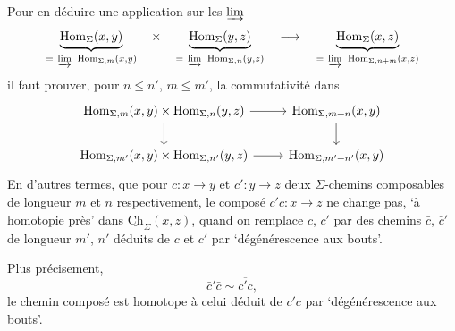 \documentclass[11pt]{article}
\newcommand{\msp}[1]{\marginpar{\footnotesize [#1]}}
\newcommand{\uCh}{\underline{\mathrm{Ch}}}
\newcommand{\Hom}{\mathrm{Hom}}
\begin{document}
\msp{page 10}
Pour en déduire une application sur les $\varinjlim$
\[
\underbrace{\Hom_\Sigma(x,y)}_{=\ \varinjlim\ \Hom_{\Sigma,m}(x,y)}\quad\times\quad\underbrace{\Hom_\Sigma(y,z)}_{=\ \varinjlim\ \Hom_{\Sigma,n}(y,z)}\quad\longrightarrow\quad\underbrace{\Hom_\Sigma(x,z)}_{=\ \varinjlim\ \Hom_{\Sigma,n+m}(x,z)}
\]
il faut prouver, pour $n\leq n'$, $m\leq m'$, la commutativité dans
\[
\begin{tikzcd}
\Hom_{\Sigma,m}(x,y)\times\Hom_{\Sigma,n}(y,z) \arrow[r] \arrow[d] & \Hom_{\Sigma,m+n}(x,y) \arrow[d] \\
\Hom_{\Sigma,m'}(x,y)\times\Hom_{\Sigma,n'}(y,z) \arrow[r] & \Hom_{\Sigma,m'+n'}(x,y)
\end{tikzcd}
\]
 En d'autres termes, que pour $c:x\longrightarrow y$ et $c':y\longrightarrow z$ deux $\Sigma$-chemins composables de longueur $m$ et $n$ respectivement, le composé $c'c:x\longrightarrow z$ ne change pas, `à homotopie près' dans $\uCh_\Sigma(x,z)$, quand on remplace $c$, $c'$ par des chemins $\bar{c}$, $\bar{c}'$ de longueur $m'$, $n'$ déduits de $c$ et $c'$ par `dégénérescence aux bouts'.

Plus précisement, %
\[
\bar{c}'\bar{c}\sim\overline{c'c},
\]
le chemin composé est homotope à celui déduit de $c'c$ par `dégénérescence aux bouts'.
\end{document}
